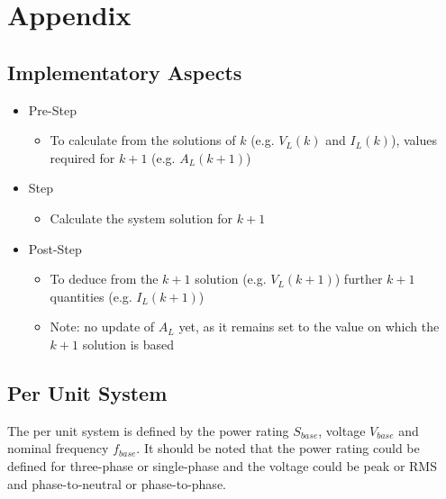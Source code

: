 \chapter{Appendix}

\section{Implementatory Aspects}

\begin{itemize}
	\item Pre-Step
	\begin{itemize}
		\item To calculate from the solutions of $k$ (e.g. $V_L(k)$ and $I_L(k)$), values required for $k+1$ (e.g. $A_L(k+1)$)
	\end{itemize}
	\item Step
	\begin{itemize}
		\item Calculate the system solution for $k+1$
	\end{itemize}
	\item Post-Step
	\begin{itemize}
		\item To deduce from the $k+1$ solution (e.g. $V_L(k+1)$) further $k+1$ quantities (e.g. $I_L(k+1)$)
		\item Note: no update of $A_L$ yet, as it remains set to the value on which the $k+1$ solution is based
	\end{itemize}
\end{itemize}

\section{Per Unit System}
The per unit system is defined by the power rating $S_{base}$, voltage $V_{base}$ and nominal frequency $f_{base}$. It should be noted that the power rating could be defined for three-phase or single-phase and the voltage could be peak or RMS and phase-to-neutral or phase-to-phase.


